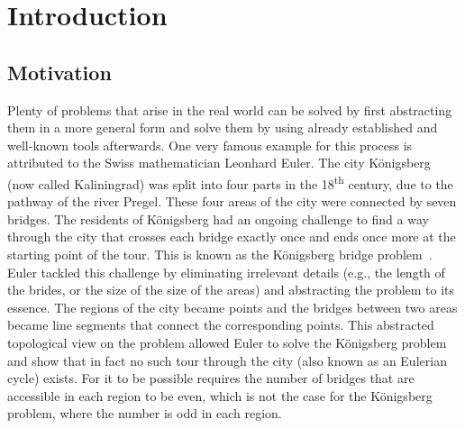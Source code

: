 \chapter{Introduction}
\label{cha:introduction}


\section{Motivation}
\label{sec:motivation}

Plenty of problems that arise in the real world can be solved by first abstracting them in a more general form and solve them by using already established and well-known tools afterwards.
One very famous example for this process is attributed to the Swiss mathematician Leonhard Euler.
The city Königsberg (now called Kaliningrad) was split into four parts in the 18\textsuperscript{th} century, due to the pathway of the river Pregel.
These four areas of the city were connected by seven bridges.
The residents of Königsberg had an ongoing challenge to find a way through the city that crosses each bridge exactly once and ends once more at the starting point of the tour.
This is known as the Königsberg bridge problem~\cite{Paoletti2011, Cook2012}.
Euler tackled this challenge by eliminating irrelevant details (e.g., the length of the brides, or the size of the size of the areas) and abstracting the problem to its essence.
The regions of the city became points and the bridges between two areas became line segments that connect the corresponding points.
This abstracted topological view on the problem allowed Euler to solve the Königsberg problem and show that in fact no such tour through the city (also known as an Eulerian cycle) exists.
For it to be possible requires the number of bridges that are accessible in each region to be even, which is not the case for the Königsberg problem, where the number is odd in each region.

